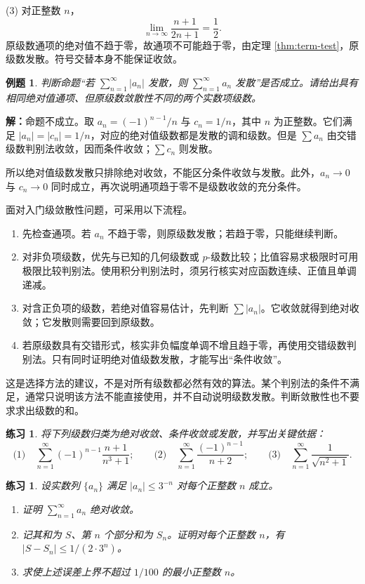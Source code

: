 \documentclass[UTF8,fontset=fandol,11pt]{ctexart}
\newtheorem{example}[definition]{例题}
\newtheorem{exercise}[definition]{练习}
\begin{document}
(3) 对正整数 $n$，
\[
\lim_{n\to\infty}\frac{n+1}{2n+1}=\frac12.
\]
原级数通项的绝对值不趋于零，故通项不可能趋于零，由定理 \ref{thm:term-test}，原级数发散。符号交替本身不能保证收敛。\par
\begin{example}
判断命题“若 $\sum_{n=1}^{\infty}|a_n|$ 发散，则 $\sum_{n=1}^{\infty}a_n$ 发散”是否成立。请给出具有相同绝对值通项、但原级数敛散性不同的两个实数项级数。
\end{example}
\par\noindent\textbf{解：}命题不成立。取 $a_n=(-1)^{n-1}/n$ 与 $c_n=1/n$，其中 $n$ 为正整数。它们满足 $|a_n|=|c_n|=1/n$，对应的绝对值级数都是发散的调和级数。但是 $\sum a_n$ 由交错级数判别法收敛，因而条件收敛；$\sum c_n$ 则发散。

所以绝对值级数发散只排除绝对收敛，不能区分条件收敛与发散。此外，$a_n\to0$ 与 $c_n\to0$ 同时成立，再次说明通项趋于零不是级数收敛的充分条件。\par
面对入门级敛散性问题，可采用以下流程。
\begin{enumerate}
\item 先检查通项。若 $a_n$ 不趋于零，则原级数发散；若趋于零，只能继续判断。
\item 对非负项级数，优先与已知的几何级数或 $p$-级数比较；比值容易求极限时可用极限比较判别法。使用积分判别法时，须另行核实对应函数连续、正值且单调递减。
\item 对含正负项的级数，若绝对值容易估计，先判断 $\sum |a_n|$。它收敛就得到绝对收敛；它发散则需要回到原级数。
\item 若原级数具有交错形式，核实非负幅度单调不增且趋于零，再使用交错级数判别法。只有同时证明绝对值级数发散，才能写出“条件收敛”。
\end{enumerate}
这是选择方法的建议，不是对所有级数都必然有效的算法。某个判别法的条件不满足，通常只说明该方法不能直接使用，并不自动说明级数发散。判断敛散性也不要求求出级数的和。\par
\begin{exercise}
\label{mathagent:exercise:27bb19e689d418d4f9c09f7745bf38991d8dd5d7991ddbf7b549bde8e9c20fcb}
将下列级数归类为绝对收敛、条件收敛或发散，并写出关键依据：
\[
\text{(1)}\quad\sum_{n=1}^{\infty}(-1)^{n-1}\frac{n+1}{n^3+1};\qquad
\text{(2)}\quad\sum_{n=1}^{\infty}\frac{(-1)^{n-1}}{n+2};\qquad
\text{(3)}\quad\sum_{n=1}^{\infty}\frac1{\sqrt{n^2+1}}.
\]
\end{exercise}
\begin{exercise}
\label{mathagent:exercise:8df9c883175539781c5297e80328cb621961e5226b4ee75741c01793ba96210d}
设实数列 $\{a_n\}$ 满足 $|a_n|\leq3^{-n}$ 对每个正整数 $n$ 成立。
\begin{enumerate}
\item 证明 $\sum_{n=1}^{\infty}a_n$ 绝对收敛。
\item 记其和为 $S$、第 $n$ 个部分和为 $S_n$。证明对每个正整数 $n$，有 $|S-S_n|\leq1/(2\cdot3^n)$。
\item 求使上述误差上界不超过 $1/100$ 的最小正整数 $n$。
\end{enumerate}
\end{exercise}
\end{document}
